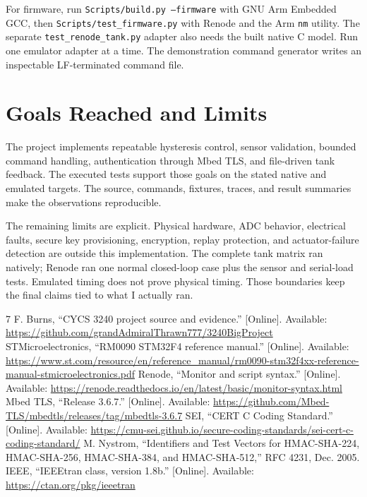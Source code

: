 \documentclass[conference]{IEEEtran}
\begin{document}
For firmware, run \texttt{Scripts/build.py --firmware} with GNU Arm Embedded GCC, then \texttt{Scripts/test\_firmware.py} with Renode and the Arm \texttt{nm} utility. The separate \texttt{test\_renode\_tank.py} adapter also needs the built native C model. Run one emulator adapter at a time. The demonstration command generator writes an inspectable LF-terminated command file.

\balance
\section{Goals Reached and Limits}
The project implements repeatable hysteresis control, sensor validation, bounded command handling, authentication through Mbed TLS, and file-driven tank feedback. The executed tests support those goals on the stated native and emulated targets. The source, commands, fixtures, traces, and result summaries make the observations reproducible.

The remaining limits are explicit. Physical hardware, ADC behavior, electrical faults, secure key provisioning, encryption, replay protection, and actuator-failure detection are outside this implementation. The complete tank matrix ran natively; Renode ran one normal closed-loop case plus the sensor and serial-load tests. Emulated timing does not prove physical timing. Those boundaries keep the final claims tied to what I actually ran.

\begin{thebibliography}{7}
 F. Burns, ``CYCS 3240 project source and evidence.'' [Online]. Available: \url{https://github.com/grandAdmiralThrawn777/3240BigProject}
 STMicroelectronics, ``RM0090 STM32F4 reference manual.'' [Online]. Available: \url{https://www.st.com/resource/en/reference_manual/rm0090-stm32f4xx-reference-manual-stmicroelectronics.pdf}
 Renode, ``Monitor and script syntax.'' [Online]. Available: \url{https://renode.readthedocs.io/en/latest/basic/monitor-syntax.html}
 Mbed TLS, ``Release 3.6.7.'' [Online]. Available: \url{https://github.com/Mbed-TLS/mbedtls/releases/tag/mbedtls-3.6.7}
 SEI, ``CERT C Coding Standard.'' [Online]. Available: \url{https://cmu-sei.github.io/secure-coding-standards/sei-cert-c-coding-standard/}
 M. Nystrom, ``Identifiers and Test Vectors for HMAC-SHA-224, HMAC-SHA-256, HMAC-SHA-384, and HMAC-SHA-512,'' RFC 4231, Dec. 2005.
 IEEE, ``IEEEtran class, version 1.8b.'' [Online]. Available: \url{https://ctan.org/pkg/ieeetran}
\end{thebibliography}
\end{document}
